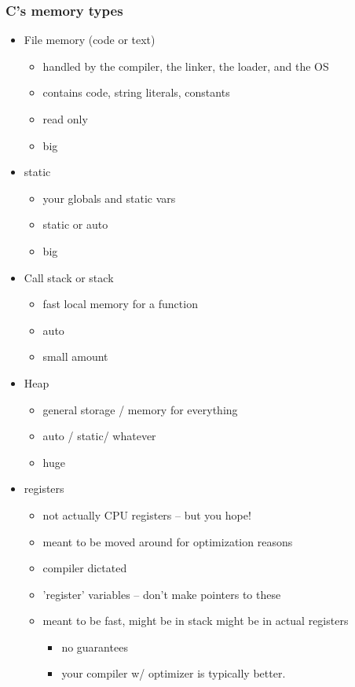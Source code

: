 \documentclass[11pt]{article}
\begin{document}
\subsubsection{C's memory types}
\label{sec:org908b849}

\begin{itemize}
\item File memory (code or text) 
\begin{itemize}
\item handled by the compiler, the linker, the loader, and the OS
\item contains code, string literals, constants
\item read only
\item big
\end{itemize}
\item static 
\begin{itemize}
\item your globals and static vars
\item static or auto
\item big
\end{itemize}
\item Call stack or stack
\begin{itemize}
\item fast local memory for a function
\item auto
\item small amount
\end{itemize}
\item Heap
\begin{itemize}
\item general storage / memory for everything
\item auto / static/ whatever
\item huge
\end{itemize}
\item registers
\begin{itemize}
\item not actually CPU registers -- but you hope!
\item meant to be moved around for optimization reasons
\item compiler dictated
\item 'register' variables -- don't make pointers to these
\item meant to be fast, might be in stack might be in actual registers
\begin{itemize}
\item no guarantees
\item your compiler w/ optimizer is typically better.
\end{itemize}
\end{itemize}
\end{itemize}
\end{document}
